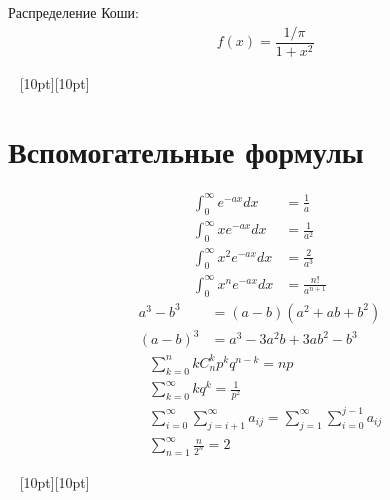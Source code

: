 \documentclass[a4paper,12pt,fleqn]{article}
\numberwithin{figure}{section}
\theoremstyle{definition}
\def\vignette{\vspace{48pt} \noindent \hrulefill~
	          \raisebox{-8pt}[10pt][10pt]{\Huge\ding{102}}
	          ~\hrulefill}
\begin{document}
Распределение Коши:
\begin{align*}
&	f(x)=\dfrac{1/\pi}{1+x^2}
\end{align*}


\vignette
\section{Вспомогательные формулы}

\begin{align*}
	   \int_0^\infty     e^{-ax}dx &= \frac{1}{a}
	\\ \int_0^\infty x   e^{-ax}dx &= \frac{1}{a^2}
	\\ \int_0^\infty x^2 e^{-ax}dx &= \frac{2}{a^3}
	\\ \int_0^\infty x^n e^{-ax}dx &= \frac{n!}{a^{n+1}}
\end{align*}
\begin{align*}
	   a^3-b^3 &= (a-b)(a^2+ab+b^2)
	\\ (a-b)^3 &= a^3-3a^2b+3ab^2-b^3
\end{align*}
\begin{align*}
&	\sum_{k=0}^n k C_n^k p^k q^{n-k} = np \\
&	\sum_{k=0}^{\infty}kq^k = \frac{1}{p^2} \\
&	\sum_{i=0}^{\infty}\sum_{j=i+1}^{\infty}a_{ij} =
	\sum_{j=1}^{\infty}\sum_{i=0}^{j-1}a_{ij} \\
&	\sum_{n=1}^{\infty}\frac{n}{2^n} = 2
\end{align*}

\vignette
\end{document}
